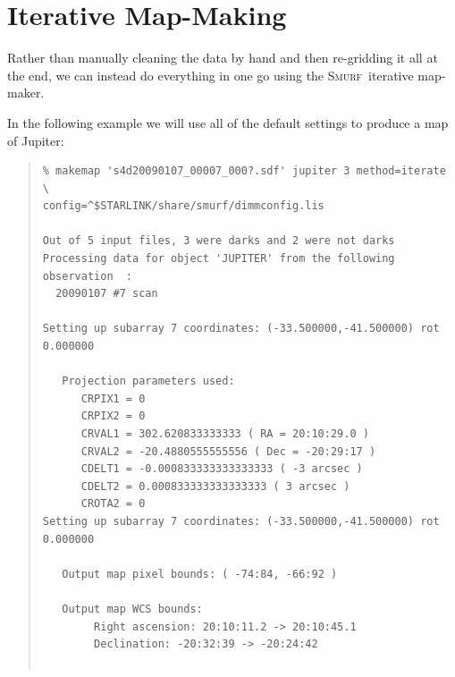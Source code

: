 \documentclass[twoside,11pt]{article}
\newenvironment{myquote}{\begin{quote}\begin{small}}{\end{small}\end{quote}}
\newcommand{\smurf}{\xref{\textsc{Smurf}}{sun258}{}}
\newcommand{\xref}[3]{#1}
\newcommand{\xlabel}[1]{}
\renewcommand{\_}{\texttt{\symbol{95}}}
\begin{document}
\section{\xlabel{maps}Iterative Map-Making} 

Rather than manually cleaning the data by hand and then re-gridding it
all at the end, we can instead do everything in one go using the
\smurf\ iterative map-maker. 

In the following example we will use all of the default settings to
produce a map of Jupiter:

\begin{myquote}
\begin{verbatim}
% makemap 's4d20090107_00007_000?.sdf' jupiter 3 method=iterate \
config=^$STARLINK/share/smurf/dimmconfig.lis

Out of 5 input files, 3 were darks and 2 were not darks
Processing data for object 'JUPITER' from the following observation  :
  20090107 #7 scan

Setting up subarray 7 coordinates: (-33.500000,-41.500000) rot 0.000000

   Projection parameters used:
      CRPIX1 = 0
      CRPIX2 = 0
      CRVAL1 = 302.620833333333 ( RA = 20:10:29.0 )
      CRVAL2 = -20.4880555555556 ( Dec = -20:29:17 )
      CDELT1 = -0.000833333333333333 ( -3 arcsec )
      CDELT2 = 0.000833333333333333 ( 3 arcsec )
      CROTA2 = 0
Setting up subarray 7 coordinates: (-33.500000,-41.500000) rot 0.000000

   Output map pixel bounds: ( -74:84, -66:92 )

   Output map WCS bounds:
        Right ascension: 20:10:11.2 -> 20:10:45.1
        Declination: -20:32:39 -> -20:24:42


\end{verbatim}
\end{myquote}
\end{document}
